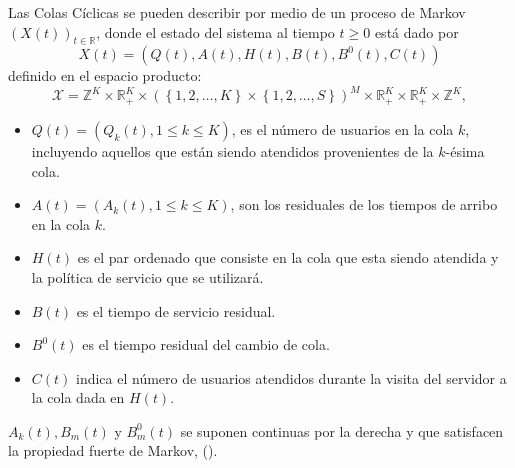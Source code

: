 \documentclass{article}
\newcommand{\rea}{\mathbb{R}}
\numberwithin{equation}{section}
\begin{document}
Las Colas C\'iclicas se pueden describir por medio de un proceso de Markov $\left(X\left(t\right)\right)_{t\in\rea}$, donde el estado del sistema al tiempo $t\geq0$ est\'a dado por
\begin{equation}
X\left(t\right)=\left(Q\left(t\right),A\left(t\right),H\left(t\right),B\left(t\right),B^{0}\left(t\right),C\left(t\right)\right)
\end{equation}
definido en el espacio producto:
\begin{equation}
\mathcal{X}=\mathbb{Z}^{K}\times\rea_{+}^{K}\times\left(\left\{1,2,\ldots,K\right\}\times\left\{1,2,\ldots,S\right\}\right)^{M}\times\rea_{+}^{K}\times\rea_{+}^{K}\times\mathbb{Z}^{K},
\end{equation}

\begin{itemize}
\item $Q\left(t\right)=\left(Q_{k}\left(t\right),1\leq k\leq K\right)$, es el n\'umero de usuarios en la cola $k$, incluyendo aquellos que est\'an siendo atendidos provenientes de la $k$-\'esima cola.

\item $A\left(t\right)=\left(A_{k}\left(t\right),1\leq k\leq
 K\right)$, son los residuales de los tiempos de arribo en la cola $k$. \item $H\left(t\right)$ es el par ordenado que consiste en la cola que esta siendo atendida y la pol\'itica de servicio que se utilizar\'a.

\item $B\left(t\right)$ es el tiempo de servicio residual.

\item $B^{0}\left(t\right)$ es el tiempo residual del cambio de cola.

\item $C\left(t\right)$ indica el n\'umero de usuarios atendidos durante la visita del servidor a la cola dada en $H\left(t\right)$.
\end{itemize}

$A_{k}\left(t\right),B_{m}\left(t\right)$ y $B_{m}^{0}\left(t\right)$ se suponen continuas por la derecha y que satisfacen la propiedad fuerte de Markov, (\cite{Dai}).
\end{document}
